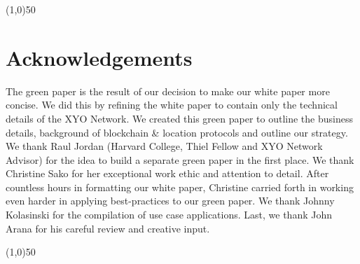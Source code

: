\documentclass{article}
\begin{document}
\begin{center}
\line(1,0){50}
\end{center}

\section {Acknowledgements}
The green paper is the result of our decision to make our white paper more concise. We did this by refining the white paper to contain only the technical details of the XYO Network. We created this green paper to outline the business details, background of blockchain \& location protocols and outline our strategy. We thank Raul Jordan (Harvard College, Thiel Fellow and XYO Network Advisor) for the idea to build a separate green paper in the first place. We thank Christine Sako for her exceptional work ethic and attention to detail. After countless hours in formatting our white paper, Christine carried forth in working even harder in applying best-practices to our green paper. We thank Johnny Kolasinski for the compilation of use case applications. Last, we thank John Arana for his careful review and creative input.


\begin{center}
\line(1,0){50}
\end{center}
\end{document}
